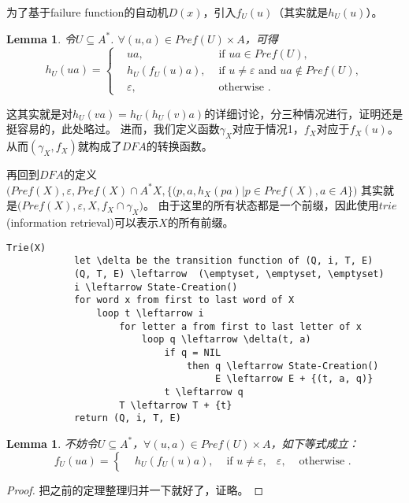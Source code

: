 \documentclass[UTF8]{ctexart}
\newtheorem{lem}[thm]{Lemma}
\theoremstyle{definition}
\theoremstyle{remark}
\numberwithin{equation}{subsection}
\begin{document}
	为了基于failure function的自动机$D(x)$，引入$f_U(u)$（其实就是$h_U(u)$）。
	\begin{lem}
		令$U \subseteq A^*$. $\forall (u,a) \in Pref(U) \times A$，可得
		\[
			h_U(ua) =
			\left\{
				\begin{aligned}
					&ua, &\text{ if } ua \in Pref(U),  \\
					&h_U(f_U(u)a), &\text{ if } u \neq \varepsilon \text{ and } ua \notin Pref(U), \\
					&\varepsilon, &\text{ otherwise }.
				\end{aligned}
			\right .
		\]
	\end{lem}
	这其实就是对$h_U(va) = h_U(h_U(v)a)$的详细讨论，分三种情况进行，证明还是挺容易的，此处略过。
	进而，我们定义函数$\gamma_X$对应于情况1，$f_X$对应于$f_X(u)$。从而$(\gamma_X, f_X)$就构成了$DFA$的转换函数。
	
	再回到$DFA$的定义$\Big( Pref(X), \varepsilon, Pref(X) \cap A^*X, \{(p,a,h_X(pa) | p \in Pref(X), a \in A\} \Big)$
	其实就是$\Big( Pref(X), \varepsilon, X, f_X \cap \gamma_X \Big)$。
	由于这里的所有状态都是一个前缀，因此使用$trie$(information retrieval)可以表示$X$的所有前缀。
	\begin{lstlisting}[frame=shadowbox,framexleftmargin=5mm,rulesepcolor=\color{gray},numbers=none]
		Trie(X)
			let \delta be the transition function of (Q, i, T, E)
			(Q, T, E) \leftarrow  (\emptyset, \emptyset, \emptyset)
			i \leftarrow State-Creation()
			for word x from first to last word of X
				loop t \leftarrow i
					for letter a from first to last letter of x
						loop q \leftarrow \delta(t, a)
							if q = NIL
								then q \leftarrow State-Creation()
									 E \leftarrow E + {(t, a, q)}
							t \leftarrow q
					T \leftarrow T + {t}
			return (Q, i, T, E)
	\end{lstlisting}
	
	\begin{lem}
		不妨令$U \subseteq A^*$，$\forall (u,a) \in Pref(U) \times A$，如下等式成立：
		\[
			f_U(ua) =
			\left\{
				\begin{aligned}
					&h_U(f_U(u)a), &\text{ if } u \neq \varepsilon,
					&\varepsilon, &\text{ otherwise }.
				\end{aligned}
			\right .
		\]
	\end{lem}
	\begin{proof}
		把之前的定理整理归并一下就好了，证略。
	\end{proof}
	
\end{document}
